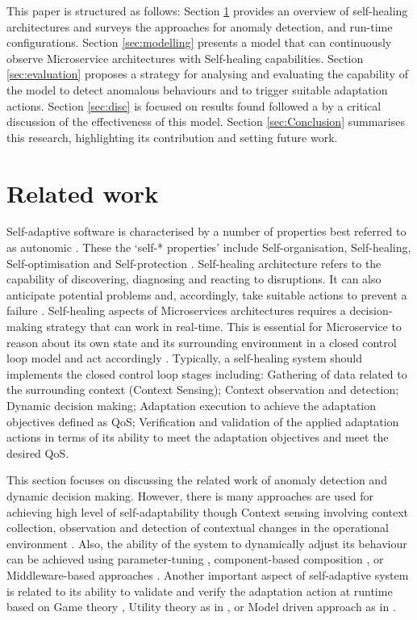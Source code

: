 \documentclass[sigconf]{acmart}
\begin{document}
This paper is structured as follows: Section \ref{sec:related-work} provides an overview of self-healing architectures and surveys the approaches for  anomaly detection, and run-time configurations. Section \ref{sec:modelling} presents a model that can continuously observe Microservice architectures with Self-healing capabilities. Section \ref{sec:evaluation} proposes a strategy for analysing and evaluating the capability of the model  to detect anomalous behaviours and to trigger suitable adaptation actions. Section \ref{sec:disc} is focused on results found followed a by a critical discussion of the effectiveness of this model. Section \ref{sec:Conclusion} summarises this research, highlighting its contribution and setting future work.

\section{Related work}
\label{sec:related-work}

Self-adaptive software is characterised by a number of properties best referred to as autonomic \cite{jelasityself}. These the `self-* properties' include Self-organisation, Self-healing, Self-optimisation and Self-protection  \cite{horn:2001p3735}. Self-healing architecture refers to  the capability of discovering, diagnosing and reacting to disruptions. It can also anticipate potential problems and, accordingly, take suitable actions to prevent a failure \cite{horn:2001p3735}. Self-healing aspects of Microservices architectures requires a decision-making strategy that can work in real-time. This is essential for Microservice to reason about its own state and its surrounding environment in a closed control loop model and act accordingly \cite{Cheng:2008p3708}.  
Typically, a self-healing system should implements the closed control loop stages including: Gathering of data related to the surrounding context (Context Sensing); Context observation and detection; Dynamic decision making; Adaptation execution to achieve the adaptation objectives defined as QoS; Verification and validation of the applied adaptation actions in terms of its ability to meet the adaptation objectives and meet the desired QoS.

This section focuses on discussing the related work of anomaly detection and dynamic decision making. However, there is many approaches are used for achieving high level of self-adaptability though Context sensing involving context collection, observation and detection of contextual changes in the operational environment \cite{Strang:2004p3770}. Also, the ability of the system to dynamically adjust its behaviour can be achieved using parameter-tuning \cite{Cheng:2009p3902}, component-based composition \cite{MariusMikalsen:2005ur}, or Middleware-based  approaches \cite{CheungFooWo:2007p1692}. Another important aspect of self-adaptive system is related to its ability to validate and verify the adaptation action at runtime based on Game theory \cite{Wei:2016ge}, Utility theory as in \cite{Menasce:2007vq,KonstantinosKakousis:2008ub}, or Model driven approach as in \cite{Sama:2008p3765}.
\end{document}
